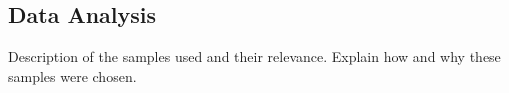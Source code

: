 \subsection{Data Analysis}\label{subsec:data_analysis}
Description of the samples used and their relevance.
Explain how and why these samples were chosen.